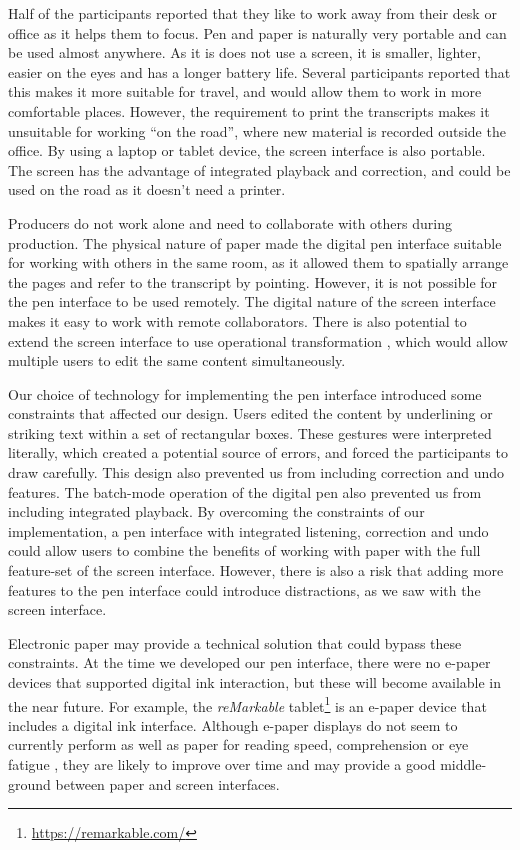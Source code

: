 Half of the participants reported that they like to work away from their desk or office as it helps them to focus. Pen
and paper is naturally very portable and can be used almost anywhere. As it is does not use a screen, it is smaller,
lighter, easier on the eyes and has a longer battery life. Several participants reported that this makes it more
suitable for travel, and would allow them to work in more comfortable places. However, the requirement to print the
transcripts makes it unsuitable for working ``on the road'', where new material is recorded outside the office. By
using a laptop or tablet device, the screen interface is also portable. The screen has the advantage of
integrated playback and correction, and could be used on the road as it doesn't need a printer.

Producers do not work alone and need to collaborate with others during production. The physical nature of paper made
the digital pen interface suitable for working with others in the same room, as it allowed them to spatially arrange
the pages and refer to the transcript by pointing. However, it is not possible for the pen interface to be used
remotely. The digital nature of the screen interface makes it easy to work with remote collaborators. There is also
potential to extend the screen interface to use operational transformation \citep{Sun2004}, which would allow multiple
users to edit the same content simultaneously.

Our choice of technology for implementing the pen interface introduced some constraints that affected our design.
Users edited the content by underlining or striking text within a set of rectangular boxes. These gestures were
interpreted literally, which created a potential source of errors, and forced the participants to draw carefully. This
design also prevented us from including correction and undo features. The batch-mode operation of the digital pen also
prevented us from including integrated playback.  By overcoming the constraints of our implementation, a pen interface
with integrated listening, correction and undo could allow users to combine the benefits of working with paper with the
full feature-set of the screen interface. However, there is also a risk that adding more features to the pen
interface could introduce distractions, as we saw with the screen interface.

Electronic paper may provide a technical solution that could bypass these constraints. At the time we developed our pen
interface, there were no e-paper devices that supported digital ink interaction, but these will become available in the
near future.  For example, the \textit{reMarkable} tablet\footnote{\url{https://remarkable.com/}} is an e-paper device
that includes a digital ink interface. Although e-paper displays do not seem to currently perform as well as paper for
reading speed, comprehension or eye fatigue \citep{Jeong2012, Daniel2013}, they are likely to improve over time and may
provide a good middle-ground between paper and screen interfaces. 


